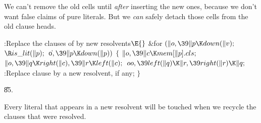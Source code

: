 We can't remove the old cells until {\it after\/}
inserting the new ones, because we don't want false claims of
pure literals. But we {\it can\/} safely detach those cells from
the old clause heads.

\Y\B\4:Replace the clauses of  by new resolvents\X${}\E{}$\6
\&{for} ${}(\|o,\39\|p\K\\{down}(\|v);{}$ ${}\R\\{is\_lit}(\|p);{}$ \|o${},\39%
\|p\K\\{down}(\|p)){}$\5
${}\{{}$\1\6
${}\|o,\39\|c\K\\{mem}[\|p].\\{cls};{}$\6
${}\|o,\39\|q\K\\{right}(\|c),\39\|r\K\\{left}(\|c);{}$\6
${}\\{oo},\39\\{left}(\|q)\K\|r,\39\\{right}(\|r)\K\|q;{}$\6
:Replace clause  by a new resolvent, if any\X;\6
\4${}\}{}$\2\par
\U85.\fi

Every literal that appears in a new resolvent will be touched
when we recycle the clauses that were resolved.

